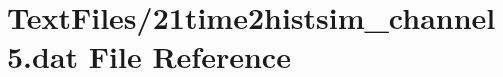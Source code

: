 \hypertarget{21time2histsim__channel5_8dat}{}\section{Text\+Files/21time2histsim\+\_\+channel5.dat File Reference}
\label{21time2histsim__channel5_8dat}
